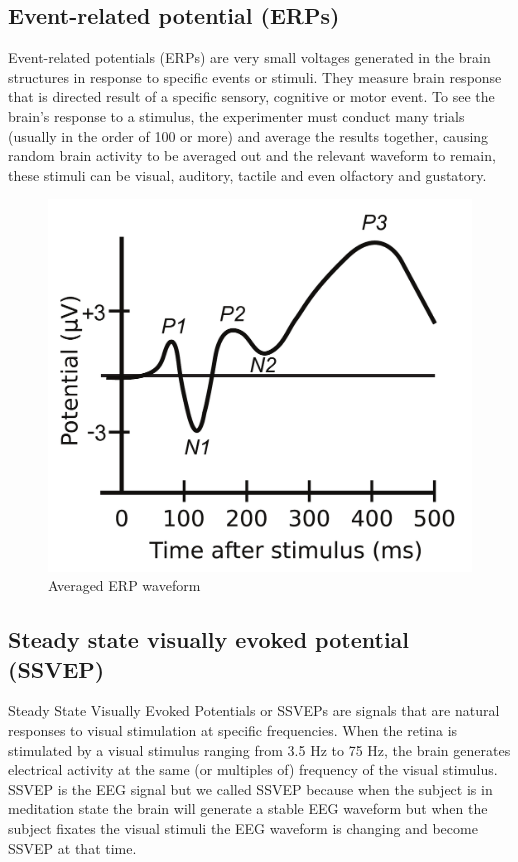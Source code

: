 \subsection{Event-related potential (ERPs)}

\hspace{1.5cm} Event-related potentials (ERPs) are very small voltages generated in the brain structures in response to specific events or stimuli. They measure brain response that is directed result of a specific sensory, cognitive or motor event. To see the brain's response to a stimulus, the experimenter must conduct many trials (usually in the order of 100 or more) and average the results together, causing random brain activity to be averaged out and the relevant waveform to remain, these stimuli can be visual, auditory, tactile and even olfactory and gustatory.

\begin{figure}[h]
	\centering
	\includegraphics[scale = 0.3]{chapter3/32.pdf}
	\caption{Averaged ERP waveform}
\end{figure}

\newpage
\subsection{Steady state visually evoked potential (SSVEP)}

\hspace{1.5cm} Steady State Visually Evoked Potentials or SSVEPs are signals that are natural responses to visual stimulation at specific frequencies. When the retina is stimulated by a visual stimulus ranging from 3.5 Hz to 75 Hz, the brain generates electrical activity at the same (or multiples of) frequency of the visual stimulus. SSVEP is the EEG signal but we called SSVEP because when the subject is in meditation state the brain will generate a stable EEG waveform but when the subject fixates the visual stimuli the EEG waveform is changing and become SSVEP at that time.\par



